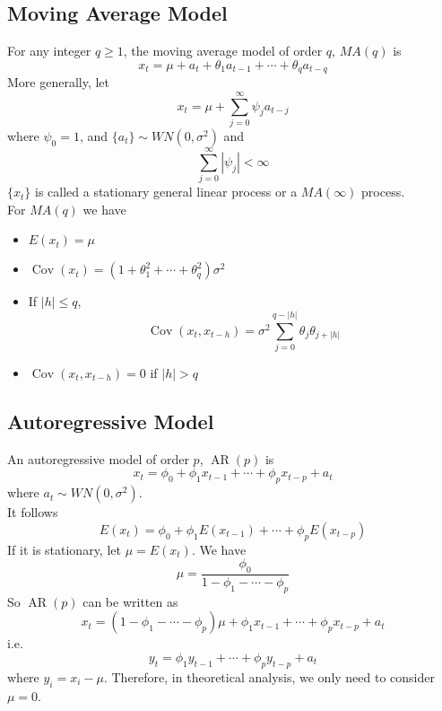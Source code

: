 \documentclass[12pt]{article}
\theoremstyle{definition}
\DeclareMathOperator{\cov}{Cov}
\DeclareMathOperator{\AR}{AR}
\begin{document}
\subsection{Moving Average Model}
For any integer $q\geq 1$, the moving average model of order $q$, $MA(q)$ is
\[
x_t = \mu + a_t +\theta_1a_{t-1} + \cdots + \theta_q a_{t-q}
\]
More generally, let 
\[
x_t = \mu + \sum_{j=0}^\infty \psi_ja_{t-j}
\]
where $\psi_0 = 1$, and $\{a_t\}\sim WN(0,\sigma^2)$ and
\[
\sum_{j=0}^\infty|\psi_j|<\infty
\]
$\{x_t\}$ is called a stationary general linear process or a $MA(\infty)$ process.\\
For $MA(q)$ we have
\begin{itemize}
  \item $E(x_t) = \mu$
  \item $\cov(x_t)=(1+\theta_1^2 + \cdots + \theta_q^2)\sigma^2$
  \item If $|h|\leq q$,
  \[
\cov(x_t, x_{t-h})=\sigma^2 \sum_{j=0}^{q-|h|} \theta_j\theta_{j+|h|}
  \]
  \item $\cov(x_t, x_{t-h})=0$ if $|h|>q$
\end{itemize}
\subsection{Autoregressive Model}
An autoregressive model of order $p$, $\AR(p)$ is
\[
x_t = \phi_0 + \phi_1x_{t-1} + \cdots + \phi_px_{t-p}+a_t
\]
where $a_t\sim WN(0, \sigma^2)$.\\
It follows
\[
E(x_t) = \phi_0 + \phi_1E(x_{t-1}) + \cdots + \phi_pE(x_{t-p})
\]
If it is stationary, let $\mu = E(x_t)$. We have
\[
\mu = \frac{\phi_0}{1-\phi_1-\cdots-\phi_p}
\]
So $\AR(p)$ can be written as
\[
x_t = (1-\phi_1-\cdots -\phi_p)\mu + \phi_1x_{t-1} + \cdots + \phi_px_{t-p} + a_t
\]
i.e.
\[
y_t = \phi_1 y_{t-1} + \cdots + \phi_py_{t-p} + a_t
\]
where $y_i = x_i - \mu$.
Therefore, in theoretical analysis, we only need to consider $\mu = 0$.\\
\end{document}
